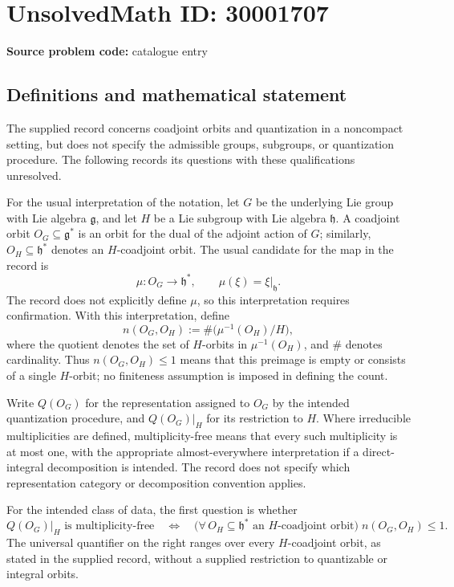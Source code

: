 \documentclass[11pt]{article}
\begin{document}
\section*{UnsolvedMath ID: 30001707}
\textbf{Source problem code:} catalogue entry
\subsection{Definitions and mathematical statement}
The supplied record concerns coadjoint orbits and quantization in a noncompact setting, but does not specify the admissible groups, subgroups, or quantization procedure. The following records its questions with these qualifications unresolved.

For the usual interpretation of the notation, let \(G\) be the underlying Lie group with Lie algebra \(\mathfrak g\), and let \(H\) be a Lie subgroup with Lie algebra \(\mathfrak h\). A coadjoint orbit \(O_G\subseteq\mathfrak g^*\) is an orbit for the dual of the adjoint action of \(G\); similarly, \(O_H\subseteq\mathfrak h^*\) denotes an \(H\)-coadjoint orbit. The usual candidate for the map in the record is
\[
\mu:O_G\longrightarrow\mathfrak h^*,\qquad
\mu(\xi)=\xi|_{\mathfrak h}.
\]
The record does not explicitly define \(\mu\), so this interpretation requires confirmation. With this interpretation, define
\[
n(O_G,O_H):=\#\bigl(\mu^{-1}(O_H)/H\bigr),
\]
where the quotient denotes the set of \(H\)-orbits in \(\mu^{-1}(O_H)\), and \(\#\) denotes cardinality. Thus \(n(O_G,O_H)\leq1\) means that this preimage is empty or consists of a single \(H\)-orbit; no finiteness assumption is imposed in defining the count.

Write \(Q(O_G)\) for the representation assigned to \(O_G\) by the intended quantization procedure, and \(Q(O_G)|_H\) for its restriction to \(H\). Where irreducible multiplicities are defined, multiplicity-free means that every such multiplicity is at most one, with the appropriate almost-everywhere interpretation if a direct-integral decomposition is intended. The record does not specify which representation category or decomposition convention applies.

For the intended class of data, the first question is whether
\[
Q(O_G)|_H\text{ is multiplicity-free}
\quad\Longleftrightarrow\quad
\bigl(\forall\,O_H\subseteq\mathfrak h^*\text{ an }H\text{-coadjoint orbit}\bigr)\;
n(O_G,O_H)\leq1.
\]
The universal quantifier on the right ranges over every \(H\)-coadjoint orbit, as stated in the supplied record, without a supplied restriction to quantizable or integral orbits.
\end{document}
